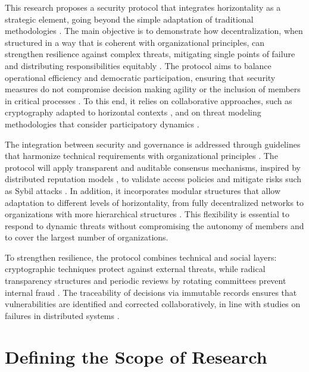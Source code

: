 This research proposes a security protocol that integrates horizontality as a
strategic element, going beyond the simple adaptation of traditional
methodologies \cite{Colbac}. The main objective is to demonstrate how
decentralization, when structured in a way that is coherent with organizational
principles, can strengthen resilience against complex threats, mitigating single
points of failure and distributing responsibilities equitably
\cite{ThreatModelingdesigningForSecurity}. The protocol aims to balance
operational efficiency and democratic participation, ensuring that security
measures do not compromise decision making agility or the inclusion of members
in critical processes \cite{Reputation-basedDAO}. To this end, it relies on
collaborative approaches, such as cryptography adapted to horizontal contexts
\cite{Colbac}, and on threat modeling methodologies that consider participatory
dynamics \cite{ParticipatoryThreatModelling}.

The integration between security and governance is addressed through guidelines
that harmonize technical requirements with organizational principles
\cite{ParticipatoryThreatModelling}. The protocol will apply
transparent and auditable consensus mechanisms, inspired by distributed
reputation models \cite{Reputation-basedDAO}, to validate access policies and
mitigate risks such as Sybil attacks \cite{MitigationSybilAttack}. In addition,
it incorporates modular structures that allow adaptation to different levels of
horizontality, from fully decentralized networks to organizations with more
hierarchical structures \cite{Colbac}. This flexibility is essential to respond
to dynamic threats without compromising the autonomy of members and to cover the
largest number of organizations.

To strengthen resilience, the protocol combines technical and social layers:
cryptographic techniques protect against external threats, while radical
transparency structures and periodic reviews by rotating committees prevent
internal fraud \cite{EverydayRevolutions}. The traceability of decisions via
immutable records ensures that vulnerabilities are identified and corrected
collaboratively, in line with studies on failures in distributed systems
\cite{Reputation-basedDAO}.

\section{Defining the Scope of Research}
\label{sec:defining_research_scope}


